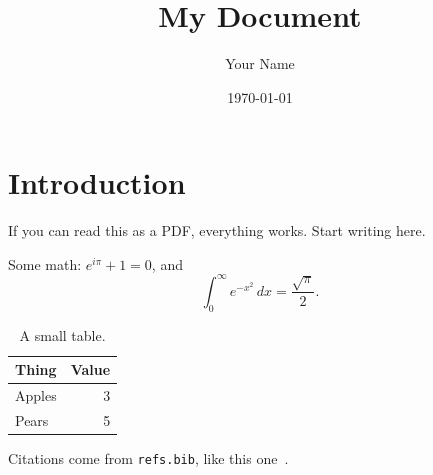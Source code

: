 \documentclass[11pt]{article}
\title{My Document}
\author{Your Name}
\date{\today}
\begin{document}
\maketitle

\section{Introduction}
If you can read this as a PDF, everything works. Start writing here.

Some math: $e^{i\pi} + 1 = 0$, and
\begin{equation}
  \int_0^\infty e^{-x^2}\,dx = \frac{\sqrt{\pi}}{2}.
\end{equation}

\begin{table}[h]
  \centering
  \begin{tabular}{lr}
    \toprule
    Thing & Value \\
    \midrule
    Apples & 3 \\
    Pears  & 5 \\
    \bottomrule
  \end{tabular}
  \caption{A small table.}
\end{table}

Citations come from \texttt{refs.bib}, like this one~\cite{knuth1984}.

\printbibliography
\end{document}
